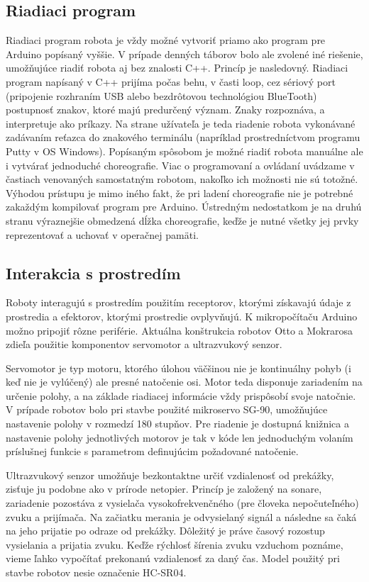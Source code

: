 \subsection{Riadiaci program}
Riadiaci program robota je vždy možné vytvoriť priamo ako program pre Arduino popísaný vyššie. V prípade denných táborov bolo ale zvolené iné riešenie, umožňujúce riadiť robota aj bez znalosti C++. Princíp je nasledovný. Riadiaci program napísaný v C++ prijíma počas behu, v časti loop, cez sériový port (pripojenie rozhraním USB alebo bezdrôtovou technológiou BlueTooth) postupnosť znakov, ktoré majú predurčený význam. Znaky rozpoznáva, a interpretuje ako príkazy. Na strane užívateľa je teda riadenie robota vykonávané zadávaním reťazca do znakového terminálu (napríklad prostredníctvom programu Putty v OS Windows). Popísaným spôsobom je možné riadiť robota manuálne ale i vytvárať jednoduché choreografie. Viac o programovaní a ovládaní uvádzame v častiach venovaných samostatným robotom, nakoľko ich možnosti nie sú totožné. Výhodou prístupu je mimo iného fakt, že pri ladení choreografie nie je potrebné zakaždým kompilovať program pre Arduino. Ústredným nedostatkom je na druhú stranu výraznejšie obmedzená dĺžka choreografie, keďže je nutné všetky jej prvky reprezentovať a uchovať v operačnej pamäti.

\subsection{Interakcia s prostredím}
Roboty interagujú s prostredím použitím receptorov, ktorými získavajú údaje z prostredia a efektorov, ktorými prostredie ovplyvňujú. K mikropočítaču Arduino možno pripojiť rôzne periférie. Aktuálna konštrukcia robotov Otto a Mokrarosa zdieľa použitie komponentov servomotor a ultrazvukový senzor.

Servomotor je typ motoru, ktorého úlohou väčšinou nie je kontinuálny pohyb (i keď nie je vylúčený) ale presné natočenie osi. Motor teda disponuje zariadením na určenie polohy, a na základe riadiacej informácie vždy prispôsobí svoje natočnie. V prípade robotov bolo pri stavbe použité mikroservo SG-90, umožňujúce nastavenie polohy v rozmedzí 180 stupňov. Pre riadenie je dostupná knižnica a nastavenie polohy jednotlivých motorov je tak v kóde len jednoduchým volaním príslušnej funkcie s parametrom definujúcim požadované natočenie.

Ultrazvukový senzor umožňuje bezkontaktne určiť vzdialenosť od prekážky, zisťuje ju podobne ako v prírode netopier. Princíp je založený na sonare, zariadenie pozostáva z vysielača vysokofrekvenčného (pre človeka nepočuteľného) zvuku a prijímača. Na začiatku merania je odvysielaný signál a následne sa čaká na jeho prijatie po odraze od prekážky. Dôležitý je práve časový rozostup vysielania a prijatia  zvuku. Keďže rýchlosť šírenia zvuku vzduchom poznáme, vieme ľahko vypočítať prekonanú vzdialenosť za daný čas. Model použitý pri stavbe robotov nesie označenie HC-SR04.

